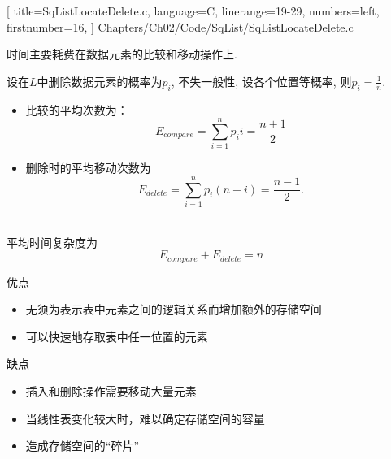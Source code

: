 \begin{frame}[fragile]

[
title=SqListLocateDelete.c,
language=C,
linerange={19-29},
numbers=left,
firstnumber=16,
]
{Chapters/Ch02/Code/SqList/SqListLocateDelete.c}
\end{frame}

\begin{frame}
时间主要耗费在数据元素的比较和移动操作上. \vspace{0.1in}

设在$L$中删除数据元素的概率为$p_i$,  不失一般性,  设各个位置等概率,  则$p_i=\frac1{n}$. 
\begin{itemize}
\item 比较的平均次数为：
$$
E_{compare} = \sum_{i=1}^n p_i i= \frac{n+1}2
$$
\item 删除时的平均移动次数为
$$
E_{delete} =\sum_{i=1}^n p_i (n-i)=\frac {n-1}2.
$$\
\end{itemize}
平均时间复杂度为
\[
E_{compare}+E_{delete}=n
\]

\end{frame}


\begin{frame}
\textcolor{acolor5}{优点}
\begin{itemize}
\item 无须为表示表中元素之间的逻辑关系而增加额外的存储空间
\item 可以快速地存取表中任一位置的元素
\end{itemize}
 

\pause

\textcolor{acolor5}{缺点}
\begin{itemize}
\item 插入和删除操作需要移动大量元素
\item 当线性表变化较大时，难以确定存储空间的容量
\item 造成存储空间的“碎片”
\end{itemize}


\end{frame}
